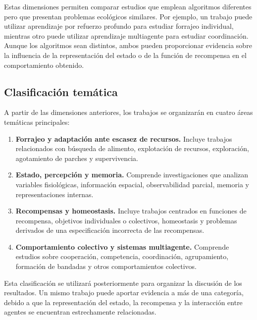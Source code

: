 \documentclass[conference]{IEEEtran}
\begin{document}
Estas dimensiones permiten comparar estudios que emplean algoritmos
diferentes pero que presentan problemas ecológicos similares. Por
ejemplo, un trabajo puede utilizar aprendizaje por refuerzo profundo para
estudiar forrajeo individual, mientras otro puede utilizar aprendizaje
multiagente para estudiar coordinación. Aunque los algoritmos sean
distintos, ambos pueden proporcionar evidencia sobre la influencia de la
representación del estado o de la función de recompensa en el
comportamiento obtenido.

\subsection{Clasificación temática}

A partir de las dimensiones anteriores, los trabajos se organizarán en
cuatro áreas temáticas principales:

\begin{enumerate}

    \item \textbf{Forrajeo y adaptación ante escasez de recursos.}
    Incluye trabajos relacionados con búsqueda de alimento, explotación
    de recursos, exploración, agotamiento de parches y supervivencia.

    \item \textbf{Estado, percepción y memoria.}
    Comprende investigaciones que analizan variables fisiológicas,
    información espacial, observabilidad parcial, memoria y
    representaciones internas.

    \item \textbf{Recompensas y homeostasis.}
    Incluye trabajos centrados en funciones de recompensa, objetivos
    individuales o colectivos, homeostasis y problemas derivados de una
    especificación incorrecta de las recompensas.

    \item \textbf{Comportamiento colectivo y sistemas multiagente.}
    Comprende estudios sobre cooperación, competencia, coordinación,
    agrupamiento, formación de bandadas y otros comportamientos
    colectivos.

\end{enumerate}

Esta clasificación se utilizará posteriormente para organizar la
discusión de los resultados. Un mismo trabajo puede aportar evidencia a
más de una categoría, debido a que la representación del estado, la
recompensa y la interacción entre agentes se encuentran estrechamente
relacionadas.
\end{document}

